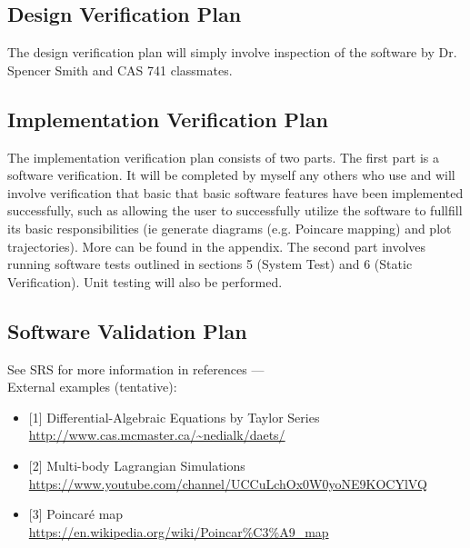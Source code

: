 \documentclass[12pt, titlepage]{article}
\begin{document}

\subsection{Design Verification Plan}

The design verification plan will simply involve inspection of the software by 
Dr. Spencer Smith and CAS 741 classmates. \\ 


\subsection{Implementation Verification Plan}

The implementation verification plan consists of two parts. The first part 
is a software verification. It will be completed by myself any others who 
use \progname and will involve verification that basic that basic software 
features have been implemented successfully, 
such as allowing the user to successfully utilize the software to fullfill
its basic responsibilities (ie generate diagrams (e.g. Poincare
mapping) and plot trajectories). 
More can be found in the appendix. The 
second part involves running software tests 
outlined in sections 5 (System Test) and 6 (Static Verification). 
Unit testing will also be performed. 


\subsection{Software Validation Plan}

See SRS for more information in references ---\\
External examples (tentative):

\begin{itemize}
\item{[1]} Differential-Algebraic Equations by Taylor Series
\\\url{http://www.cas.mcmaster.ca/~nedialk/daets/}
\item{[2]} Multi-body Lagrangian Simulations
\\\url{https://www.youtube.com/channel/UCCuLchOx0W0yoNE9KOCYlVQ}
\item{[3]} Poincaré map
\\\url{https://en.wikipedia.org/wiki/Poincar%C3%A9_map}
\end{itemize}
\end{document}
